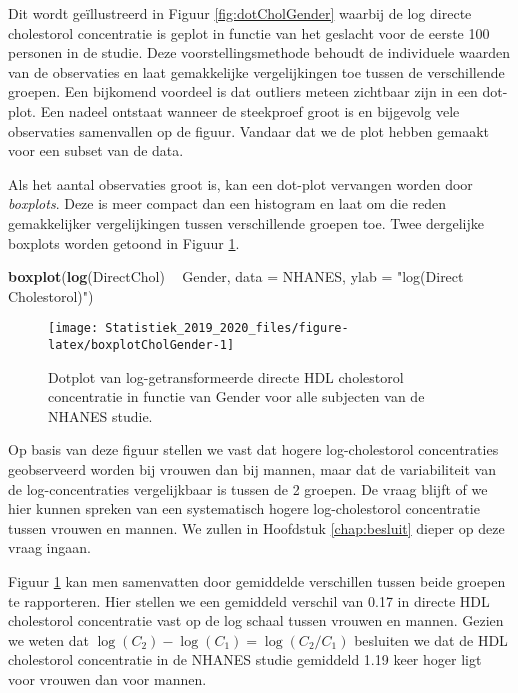 \documentclass[12pt,dutch,coursenotes]{book}
\newenvironment{Shaded}{\begin{snugshade}}{\end{snugshade}}
\newcommand{\KeywordTok}[1]{\textcolor[rgb]{0.13,0.29,0.53}{\textbf{#1}}}
\newcommand{\DataTypeTok}[1]{\textcolor[rgb]{0.13,0.29,0.53}{#1}}
\newcommand{\StringTok}[1]{\textcolor[rgb]{0.31,0.60,0.02}{#1}}
\newcommand{\OperatorTok}[1]{\textcolor[rgb]{0.81,0.36,0.00}{\textbf{#1}}}
\newcommand{\NormalTok}[1]{#1}
\theoremstyle{definition}
\theoremstyle{definition}
\theoremstyle{definition}
\theoremstyle{remark}
\begin{document}
Dit wordt geïllustreerd in Figuur \ref{fig:dotCholGender} waarbij de log
directe cholestorol concentratie is geplot in functie van het geslacht
voor de eerste 100 personen in de studie. Deze voorstellingsmethode
behoudt de individuele waarden van de observaties en laat gemakkelijke
vergelijkingen toe tussen de verschillende groepen. Een bijkomend
voordeel is dat outliers meteen zichtbaar zijn in een dot-plot. Een
nadeel ontstaat wanneer de steekproef groot is en bijgevolg vele
observaties samenvallen op de figuur. Vandaar dat we de plot hebben
gemaakt voor een subset van de data.

Als het aantal observaties groot is, kan een dot-plot vervangen worden
door \emph{boxplots}. Deze is meer compact dan een histogram en laat om
die reden gemakkelijker vergelijkingen tussen verschillende groepen toe.
Twee dergelijke boxplots worden getoond in Figuur
\ref{fig:boxplotCholGender}.

\begin{Shaded}
\begin{Highlighting}[]
\KeywordTok{boxplot}\NormalTok{(}\KeywordTok{log}\NormalTok{(DirectChol) }\OperatorTok{~}\StringTok{ }\NormalTok{Gender, }\DataTypeTok{data =}\NormalTok{ NHANES, }\DataTypeTok{ylab =} \StringTok{"log(Direct Cholestorol)"}\NormalTok{)}
\end{Highlighting}
\end{Shaded}

\begin{figure}

{\centering \texttt{[image: Statistiek\_2019\_2020\_files/figure-latex/boxplotCholGender-1]} 

}

\caption{Dotplot van log-getransformeerde directe HDL cholestorol concentratie in functie van Gender voor alle subjecten van de NHANES studie.}\label{fig:boxplotCholGender}
\end{figure}

Op basis van deze figuur stellen we vast dat hogere log-cholestorol
concentraties geobserveerd worden bij vrouwen dan bij mannen, maar dat
de variabiliteit van de log-concentraties vergelijkbaar is tussen de 2
groepen. De vraag blijft of we hier kunnen spreken van een systematisch
hogere log-cholestorol concentratie tussen vrouwen en mannen. We zullen
in Hoofdstuk \ref{chap:besluit} dieper op deze vraag ingaan.

Figuur \ref{fig:boxplotCholGender} kan men samenvatten door gemiddelde
verschillen tussen beide groepen te rapporteren. Hier stellen we een
gemiddeld verschil van 0.17 in directe HDL cholestorol concentratie vast
op de log schaal tussen vrouwen en mannen. Gezien we weten dat
\(\log(C_2)-\log(C_1)=\log(C_2/C_1)\) besluiten we dat de HDL
cholestorol concentratie in de NHANES studie gemiddeld 1.19 keer hoger
ligt voor vrouwen dan voor mannen.
\end{document}
